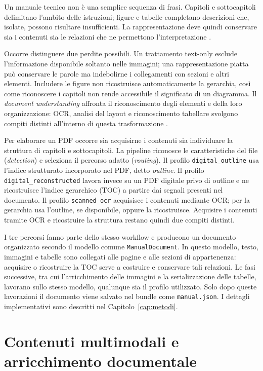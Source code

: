 Un manuale tecnico non è una semplice sequenza di frasi. Capitoli e sottocapitoli delimitano l'ambito delle istruzioni; figure e tabelle completano descrizioni che, isolate, possono risultare insufficienti. La rappresentazione deve quindi conservare sia i contenuti sia le relazioni che ne permettono l'interpretazione \parencite{auer2024docling}.

Occorre distinguere due perdite possibili. Un trattamento text-only esclude l'informazione disponibile soltanto nelle immagini; una rappresentazione piatta può conservare le parole ma indebolirne i collegamenti con sezioni e altri elementi. Includere le figure non ricostruisce automaticamente la gerarchia, così come riconoscere i capitoli non rende accessibile il significato di un diagramma. Il \emph{document understanding} affronta il riconoscimento degli elementi e della loro organizzazione: OCR, analisi del layout e riconoscimento tabellare svolgono compiti distinti all'interno di questa trasformazione \parencite{auer2024docling}.

Per elaborare un PDF occorre sia acquisirne i contenuti sia individuare la struttura di capitoli e sottocapitoli. La pipeline riconosce le caratteristiche del file (\emph{detection}) e seleziona il percorso adatto (\emph{routing}). Il profilo \texttt{digital\_outline} usa l'indice strutturato incorporato nel PDF, detto \emph{outline}. Il profilo \texttt{digital\_reconstructed} lavora invece su un PDF digitale privo di outline e ne ricostruisce l'indice gerarchico (TOC) a partire dai segnali presenti nel documento. Il profilo \texttt{scanned\_ocr} acquisisce i contenuti mediante OCR; per la gerarchia usa l'outline, se disponibile, oppure la ricostruisce. Acquisire i contenuti tramite OCR e ricostruire la struttura restano quindi due compiti distinti.

I tre percorsi fanno parte dello stesso workflow e producono un documento organizzato secondo il modello comune \texttt{ManualDocument}. In questo modello, testo, immagini e tabelle sono collegati alle pagine e alle sezioni di appartenenza: acquisire o ricostruire la TOC serve a costruire e conservare tali relazioni. Le fasi successive, tra cui l'arricchimento delle immagini e la serializzazione delle tabelle, lavorano sullo stesso modello, qualunque sia il profilo utilizzato. Solo dopo queste lavorazioni il documento viene salvato nel bundle come \texttt{manual.json}. I dettagli implementativi sono descritti nel Capitolo~\ref{cap:metodi}.

\section{Contenuti multimodali e arricchimento documentale}
\label{sec:multimodalita}

